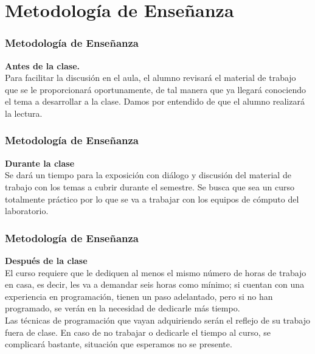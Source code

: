 \documentclass[12pt]{beamer}
\begin{document}
\section{Metodolog\'{i}a de Enseñanza}
\begin{frame}
\frametitle{Metodolog\'{i}a de Enseñanza}
\textbf{Antes de la clase.}
\\
\medskip
Para facilitar la discusi\'{o}n en el aula, el alumno revisar\'{a} el material de trabajo que se le proporcionar\'{a} oportunamente, de tal manera que ya llegar\'{a} conociendo el tema a desarrollar a la clase. Damos por entendido de que el alumno realizar\'{a} la lectura.
\end{frame}
\begin{frame}
\frametitle{Metodolog\'{i}a de Enseñanza}
\textbf{Durante la clase}
\\
\medskip
Se dar\'{a} un tiempo para la exposici\'{o}n con di\'{a}logo y discusi\'{o}n del material de trabajo con los temas a cubrir durante el semestre. Se busca que sea un curso totalmente pr\'{a}ctico por lo que se va a trabajar con los equipos de c\'{o}mputo del laboratorio.
\end{frame}
\begin{frame}
\frametitle{Metodolog\'{i}a de Enseñanza}
\textbf{Después de la clase}
\\
\medskip
El curso requiere que le dediquen al menos el mismo n\'{u}mero de horas de trabajo en casa, es decir, les va a demandar seis horas como m\'{i}nimo; si cuentan con una experiencia en programaci\'{o}n, tienen un paso adelantado, pero si no han programado, se ver\'{a}n en la necesidad de dedicarle m\'{a}s tiempo.
\\
\medskip
Las t\'{e}cnicas de programaci\'{o}n que vayan adquiriendo ser\'{a}n el reflejo de su trabajo fuera de clase. En caso de no trabajar o dedicarle el tiempo al curso, se complicar\'{a} bastante, situaci\'{o}n que esperamos no se presente.
\end{frame}
\end{document}
